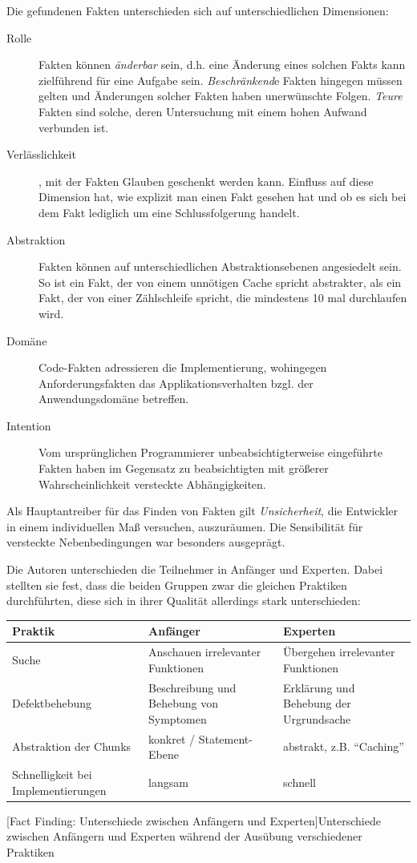 Die gefundenen Fakten unterschieden sich auf unterschiedlichen Dimensionen:
\begin{description}
\item[Rolle] Fakten können \emph{änderbar} sein, d.h. eine Änderung eines solchen Fakts kann zielführend für eine Aufgabe sein. \emph{Beschränkend}e Fakten hingegen müssen gelten und Änderungen solcher Fakten haben unerwünschte Folgen. \emph{Teure} Fakten sind solche, deren Untersuchung mit einem hohen Aufwand verbunden ist.
\item[Verlässlichkeit], mit der Fakten Glauben geschenkt werden kann. Einfluss auf diese Dimension hat, wie explizit man einen Fakt gesehen hat und ob es sich bei dem Fakt lediglich um eine Schlussfolgerung handelt.
\item[Abstraktion] Fakten können auf unterschiedlichen Abstraktionsebenen angesiedelt sein. So ist ein Fakt, der von einem unnötigen Cache spricht abstrakter, als ein Fakt, der von einer Zählschleife spricht, die mindestens 10 mal durchlaufen wird.
\item[Domäne] Code-Fakten adressieren die Implementierung, wohingegen Anforderungsfakten das Applikationsverhalten bzgl. der Anwendungsdomäne betreffen.
\item[Intention] Vom ursprünglichen Programmierer unbeabsichtigterweise eingeführte Fakten haben im Gegensatz zu beabsichtigten mit größerer Wahrscheinlichkeit versteckte Abhängigkeiten.
\end{description}

Als Hauptantreiber für das Finden von Fakten gilt \emph{Unsicherheit}, die Entwickler in einem individuellen Maß versuchen, auszuräumen. Die Sensibilität für versteckte Nebenbedingungen war besonders ausgeprägt.

Die Autoren unterschieden die Teilnehmer in Anfänger und Experten. Dabei stellten sie fest, dass die beiden Gruppen zwar die gleichen Praktiken durchführten, diese sich in ihrer Qualität allerdings stark unterschieden:

\begin{center}
  \begin{tabularx}{\linewidth}{X X X}
  \textbf{Praktik} & \textbf{Anfänger} & \textbf{Experten} \\
  \midrule
Suche & Anschauen irrelevanter Funktionen & Übergehen irrelevanter Funktionen \\
Defektbehebung & Beschreibung und Behebung von Symptomen & Erklärung und Behebung der Urgrundsache \\
Abstraktion der Chunks & konkret / Statement-Ebene & abstrakt, z.B. ``Caching'' \\
Schnelligkeit bei Implementierungen & langsam & schnell \\
  \end{tabularx}
  [Fact Finding: Unterschiede zwischen Anfängern und Experten]{Unterschiede zwischen Anfängern und Experten während der Ausübung verschiedener Praktiken}
  \label{tab:FactFinding-differences}
\end{center}

